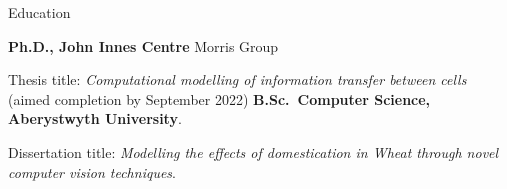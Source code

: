 \begin{rubric}{Education}

\entry*[2018 -- 2022]%
	\textbf{Ph.D., John Innes Centre} Morris Group
	\par Thesis title: \emph{Computational modelling of information transfer
	between cells} (aimed completion by September 2022)
%
\entry*[2014 -- 2018]%
	\textbf{B.Sc.~Computer Science, Aberystwyth University}.\par
	Dissertation title: \emph{Modelling the effects of domestication in Wheat through novel computer vision techniques}.
\end{rubric}